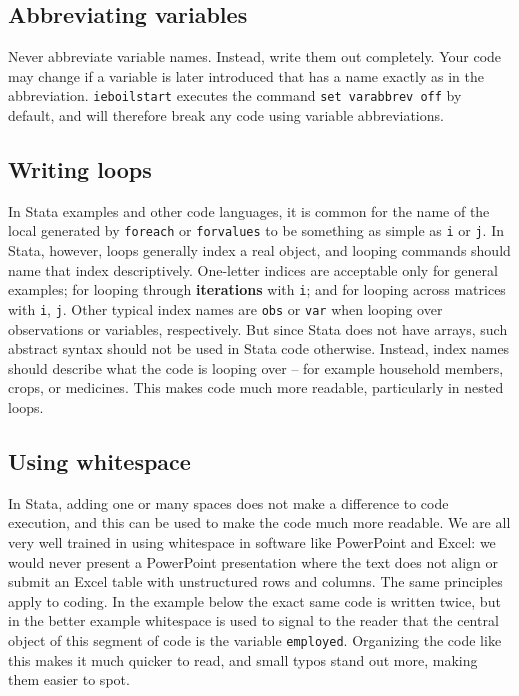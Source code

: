 \subsection{Abbreviating variables}

Never abbreviate variable names. Instead, write them out completely.
Your code may change if a variable is later introduced
that has a name exactly as in the abbreviation.
\texttt{ieboilstart} executes the command \texttt{set varabbrev off} by default,
and will therefore break any code using variable abbreviations.

\subsection{Writing loops}

In Stata examples and other code languages, it is common for the name of the local generated by \texttt{foreach} or \texttt{forvalues}
to be something as simple as \texttt{i} or \texttt{j}. In Stata, however,
loops generally index a real object, and looping commands should name that index descriptively.
One-letter indices are acceptable only for general examples;
for looping through \textbf{iterations} with \texttt{i};
and for looping across matrices with \texttt{i}, \texttt{j}.
Other typical index names are \texttt{obs} or \texttt{var} when looping over observations or variables, respectively.
But since Stata does not have arrays, such abstract syntax should not be used in Stata code otherwise.
Instead, index names should describe what the code is looping over --
for example household members, crops, or medicines.
This makes code much more readable, particularly in nested loops.


\subsection{Using whitespace}

In Stata, adding one or many spaces does not make a difference to code execution,
and this can be used to make the code much more readable.
We are all very well trained in using whitespace in software like PowerPoint and Excel:
we would never present a PowerPoint presentation where the text does not align
or submit an Excel table with unstructured rows and columns.
The same principles apply to coding.
In the example below the exact same code is written twice,
but in the better example whitespace is used to signal to the reader
that the central object of this segment of code is the variable \texttt{employed}.
Organizing the code like this makes it much quicker to read,
and small typos stand out more, making them easier to spot.

